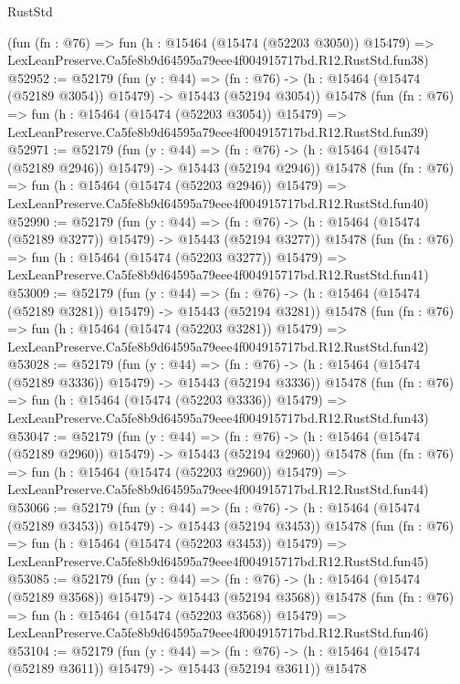 \begin{lexlean}{RustStd}
\begin{coremodule}
    (fun (fn : @76) =>
    fun (h : @15464 (@15474 (@52203 @3050)) @15479) =>
    LexLeanPreserve.Ca5fe8b9d64595a79eee4f004915717bd.R12.RustStd.fun38)
@52952 := @52179
    (fun (y : @44) =>
    (fn : @76) -> (h : @15464 (@15474 (@52189 @3054)) @15479) -> @15443 (@52194 @3054))
    @15478
    (fun (fn : @76) =>
    fun (h : @15464 (@15474 (@52203 @3054)) @15479) =>
    LexLeanPreserve.Ca5fe8b9d64595a79eee4f004915717bd.R12.RustStd.fun39)
@52971 := @52179
    (fun (y : @44) =>
    (fn : @76) -> (h : @15464 (@15474 (@52189 @2946)) @15479) -> @15443 (@52194 @2946))
    @15478
    (fun (fn : @76) =>
    fun (h : @15464 (@15474 (@52203 @2946)) @15479) =>
    LexLeanPreserve.Ca5fe8b9d64595a79eee4f004915717bd.R12.RustStd.fun40)
@52990 := @52179
    (fun (y : @44) =>
    (fn : @76) -> (h : @15464 (@15474 (@52189 @3277)) @15479) -> @15443 (@52194 @3277))
    @15478
    (fun (fn : @76) =>
    fun (h : @15464 (@15474 (@52203 @3277)) @15479) =>
    LexLeanPreserve.Ca5fe8b9d64595a79eee4f004915717bd.R12.RustStd.fun41)
@53009 := @52179
    (fun (y : @44) =>
    (fn : @76) -> (h : @15464 (@15474 (@52189 @3281)) @15479) -> @15443 (@52194 @3281))
    @15478
    (fun (fn : @76) =>
    fun (h : @15464 (@15474 (@52203 @3281)) @15479) =>
    LexLeanPreserve.Ca5fe8b9d64595a79eee4f004915717bd.R12.RustStd.fun42)
@53028 := @52179
    (fun (y : @44) =>
    (fn : @76) -> (h : @15464 (@15474 (@52189 @3336)) @15479) -> @15443 (@52194 @3336))
    @15478
    (fun (fn : @76) =>
    fun (h : @15464 (@15474 (@52203 @3336)) @15479) =>
    LexLeanPreserve.Ca5fe8b9d64595a79eee4f004915717bd.R12.RustStd.fun43)
@53047 := @52179
    (fun (y : @44) =>
    (fn : @76) -> (h : @15464 (@15474 (@52189 @2960)) @15479) -> @15443 (@52194 @2960))
    @15478
    (fun (fn : @76) =>
    fun (h : @15464 (@15474 (@52203 @2960)) @15479) =>
    LexLeanPreserve.Ca5fe8b9d64595a79eee4f004915717bd.R12.RustStd.fun44)
@53066 := @52179
    (fun (y : @44) =>
    (fn : @76) -> (h : @15464 (@15474 (@52189 @3453)) @15479) -> @15443 (@52194 @3453))
    @15478
    (fun (fn : @76) =>
    fun (h : @15464 (@15474 (@52203 @3453)) @15479) =>
    LexLeanPreserve.Ca5fe8b9d64595a79eee4f004915717bd.R12.RustStd.fun45)
@53085 := @52179
    (fun (y : @44) =>
    (fn : @76) -> (h : @15464 (@15474 (@52189 @3568)) @15479) -> @15443 (@52194 @3568))
    @15478
    (fun (fn : @76) =>
    fun (h : @15464 (@15474 (@52203 @3568)) @15479) =>
    LexLeanPreserve.Ca5fe8b9d64595a79eee4f004915717bd.R12.RustStd.fun46)
@53104 := @52179
    (fun (y : @44) =>
    (fn : @76) -> (h : @15464 (@15474 (@52189 @3611)) @15479) -> @15443 (@52194 @3611))
    @15478

\end{coremodule}
\end{lexlean}
